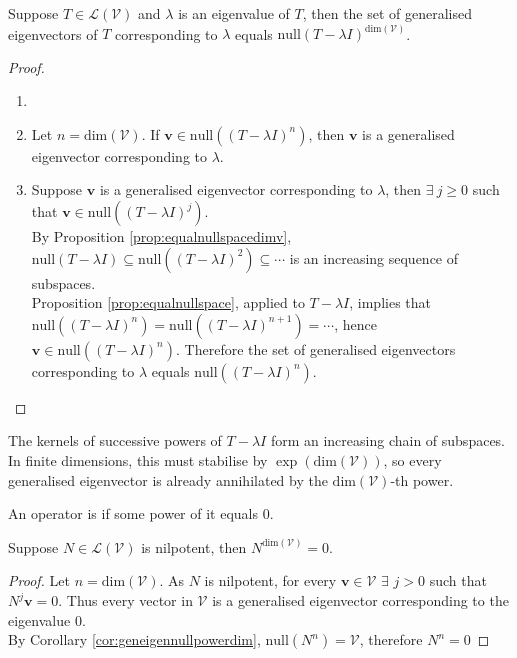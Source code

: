 \begin{corollary} \label{cor:geneigennullpowerdim} Suppose $T \in \mathcal{L}(\mathcal{V})$ and $\lambda$ is an eigenvalue of $T$, then the set of generalised eigenvectors of $T$ corresponding to $\lambda$ equals $\text{null}(T - \lambda I)^{\text{dim}(\mathcal{V})}$.
\begin{proof} 
\begin{enumerate}[label=\roman*.]
\setlength{\itemsep}{0pt}
\item[]
\item[$(\Rightarrow)$] Let $n = \text{dim}(\mathcal{V})$. If $\mathbf{v} \in \text{null}((T - \lambda I)^n)$, then $\mathbf{v}$ is a generalised eigenvector corresponding to $\lambda$.
\item[$(\Leftarrow)$] Suppose $\mathbf{v}$ is a generalised eigenvector corresponding to $\lambda$, then $\exists \ j \geq 0$ such that $\mathbf{v} \in \text{null}((T - \lambda I)^j)$.\\
By Proposition \ref{prop:equalnullspacedimv}, $\text{null}(T - \lambda I) \subseteq \text{null}((T - \lambda I)^{2}) \subseteq \cdots$ is an increasing sequence of subspaces.\\
Proposition \ref{prop:equalnullspace}, applied to $T - \lambda I$, implies that $\text{null}((T - \lambda I)^{n})= \text{null}((T - \lambda I)^{n+1}) = \cdots$, hence $\mathbf{v} \in \text{null}((T - \lambda I)^{n})$. Therefore the set of generalised eigenvectors corresponding to $\lambda$ equals $\text{null}((T - \lambda I)^{n})$.
\end{enumerate}
\end{proof}
\end{corollary}

The kernels of successive powers of $T - \lambda I$ form an increasing chain of subspaces. In finite dimensions, this must stabilise by $\exp(\text{dim}(\mathcal{V}))$, so every generalised eigenvector is already annihilated by the $\text{dim}(\mathcal{V})$-th power.

\begin{definition} An operator is  if some power of it equals $0$.
\end{definition}

\begin{corollary} Suppose $N \in \mathcal{L}(\mathcal{V})$ is nilpotent, then $N^{\text{dim}(\mathcal{V})} = 0$.
\begin{proof} Let $n = \text{dim}(\mathcal{V})$. As $N$ is nilpotent, for every $\mathbf{v} \in \mathcal{V}$ $\exists$ $j>0$ such that $N^j \mathbf{v} = 0$. Thus every vector in $\mathcal{V}$ is a generalised eigenvector corresponding to the eigenvalue $0$.\\
By Corollary \ref{cor:geneigennullpowerdim}, $\text{null}(N^n) = \mathcal{V}$, therefore $N^n = 0$
\end{proof}
\end{corollary}

